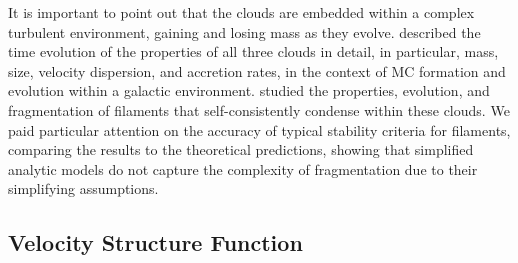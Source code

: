 It is important to point out that the clouds are embedded within a complex turbulent environment, gaining and losing mass as they evolve.
 described the time evolution of the properties of all three clouds in detail, in particular, mass, size, velocity dispersion, and accretion rates, in the context of MC formation and evolution within a galactic environment.
 studied the properties, evolution, and fragmentation of filaments that self-consistently condense within these clouds. 
We paid particular attention on the accuracy of typical stability criteria for filaments, comparing the results to the theoretical predictions, showing that simplified analytic models do not capture the complexity of fragmentation due to their simplifying assumptions.


\subsection{Velocity Structure Function}\label{methods:vsf}

